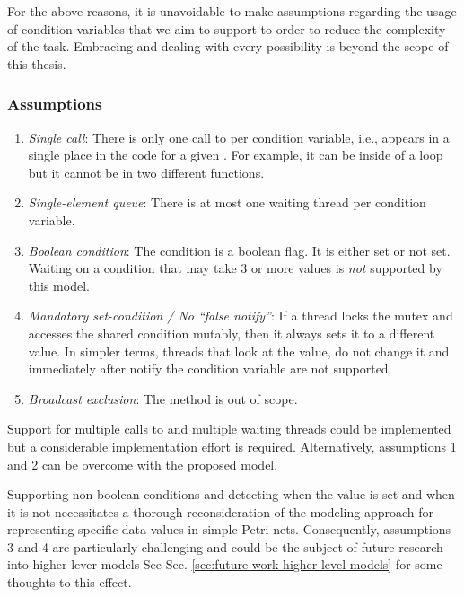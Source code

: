 For the above reasons, it is unavoidable to make assumptions
regarding the usage of condition variables that we aim to support
to order to reduce the complexity of the task.
Embracing and dealing with every possibility is beyond the scope of this thesis.

\subsubsection{Assumptions}

\begin{enumerate}
      \item \emph{Single call}: There is only one call to  per condition variable, i.e.,
             appears in a single place in the code for a given .
            For example, it can be inside of a loop but it cannot be in two different functions.
      \item \emph{Single-element queue}: There is at most one waiting thread per condition variable.
      \item \emph{Boolean condition}: The condition is a boolean flag. It is either set or not set.
            Waiting on a condition that may take 3 or more values is \emph{not} supported by this model.
      \item \emph{Mandatory set-condition / No ``false notify''}: If a thread locks the mutex and accesses the shared condition mutably,
            then it always sets it to a different value.
            In simpler terms, threads that look at the value, do not change it
            and immediately after notify the condition variable are not supported.
      \item \emph{Broadcast exclusion}: The method  is out of scope.
\end{enumerate}

Support for multiple calls to  and multiple waiting threads could be implemented
but a considerable implementation effort is required.
Alternatively, assumptions 1 and 2 can be overcome with the proposed model.

Supporting non-boolean conditions
and detecting when the value is set and when it is not
necessitates a thorough reconsideration of the modeling approach
for representing specific data values in simple Petri nets.
Consequently, assumptions 3 and 4 are particularly challenging and
could be the subject of future research into higher-lever models
See Sec. \ref{sec:future-work-higher-level-models} for some thoughts to this effect.

